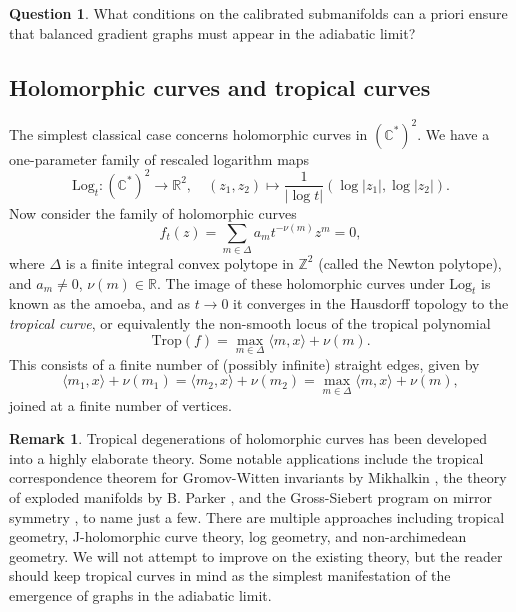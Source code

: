 \documentclass{article}
\theoremstyle{definition}
\newtheorem{rmk}{Remark}
\newtheorem{Question}{Question}
\newcommand{\R}{\mathbb{R}}
\newcommand{\C}{\mathbb{C}}
\newcommand{\Z}{\mathbb{Z}}
\begin{document}
		\begin{Question}\label{Question}
			What conditions on the calibrated submanifolds can a priori ensure that balanced gradient graphs must appear in the adiabatic limit?
		\end{Question}
		
		
		
		
		
		
		
		
		
		\subsection{Holomorphic curves and tropical curves}
		
		
		
		The simplest classical case concerns holomorphic curves in $(\C^*)^2$. We have a one-parameter family of rescaled logarithm maps
		\[
		\text{Log}_t: (\C^*)^2\to \R^2, \quad (z_1, z_2)\mapsto \frac{1}{|\log t|}(\log |z_1|, \log |z_2|).
		\]
		Now consider the family of holomorphic curves
		\[
		f_t(z)=\sum_{m\in \Delta} a_m t^{-\nu(m)} z^m =0,
		\]
		where $\Delta$ is a finite integral convex polytope in $\Z^2$ (called the Newton polytope), and $a_m\neq 0$, $\nu(m)\in \R$. The image of these holomorphic curves under $\text{Log}_t$ is known as the amoeba, and as $t\to 0$ it converges in the Hausdorff topology to the \emph{tropical curve}, or equivalently the non-smooth locus of the tropical polynomial
		\[
		\text{Trop}(f)= \max_{m\in \Delta} \langle m, x\rangle + \nu(m).
		\]
		This consists of a finite number of (possibly infinite) straight edges, given by 
		\[
		\langle m_1, x\rangle+ \nu(m_1)= \langle m_2, x\rangle+ \nu(m_2)= \max_{m\in \Delta}  \langle m, x\rangle + \nu(m),
		\]
		joined at a finite number of vertices. 
		
		
		
		
		
		
		
		
		\begin{rmk}
			Tropical degenerations of holomorphic curves has been developed into a highly elaborate theory. Some notable applications include the tropical correspondence theorem for Gromov-Witten invariants by Mikhalkin \cite{Mikhalkin}, the theory of exploded manifolds by B. Parker \cite{Parker}, and the Gross-Siebert program on mirror symmetry \cite{GrossSiebert}, to name just a few. There are multiple approaches including tropical geometry, J-holomorphic curve theory, log geometry, and non-archimedean geometry. We will not attempt to improve on the existing theory, but the reader should keep tropical curves in mind as the simplest manifestation of the emergence of graphs in the adiabatic limit.
		\end{rmk}
		
\end{document}
